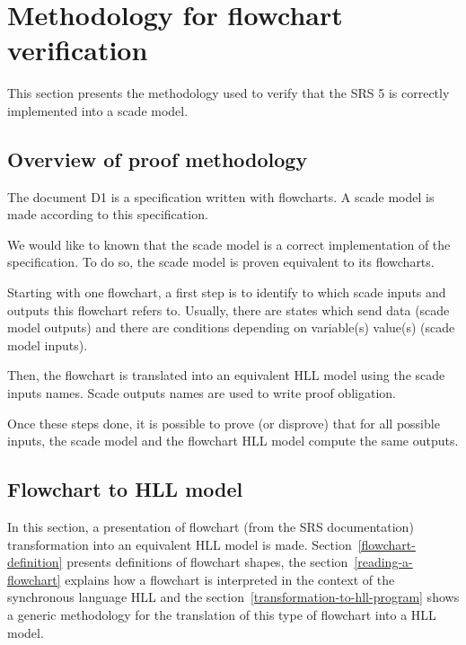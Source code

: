 \section{Methodology for flowchart verification}
\label{methodology}
This section presents the methodology used to verify that the SRS 5 is
correctly implemented into a scade model.

\subsection{Overview of proof methodology}
\label{overview}
The document D1 is a specification written with flowcharts. A scade
model is made according to this specification.

We would like to known that the scade model is a correct
implementation of the specification. To do so, the scade model is
proven equivalent to its flowcharts.

Starting with one flowchart, a first step is to identify to which
scade inputs and outputs this flowchart refers to. Usually, there are
states which send data (scade model outputs) and there are conditions
depending on variable(s) value(s) (scade model inputs).

Then, the flowchart is translated into an equivalent HLL model using
the scade inputs names. Scade outputs names are used to write proof
obligation.

Once these steps done, it is possible to prove (or disprove) that for
all possible inputs, the scade model and the flowchart HLL model
compute the same outputs.


\subsection{Flowchart to HLL model}
\label{flowchart-2-hll}
In this section, a presentation of flowchart (from the SRS
documentation) transformation into an equivalent HLL model is
made. Section~\ref{flowchart-definition} presents definitions of
flowchart shapes, the section~\ref{reading-a-flowchart} explains how a
flowchart is interpreted in the context of the synchronous language
HLL and the section~\ref{transformation-to-hll-program} shows a
generic methodology for the translation of this type of flowchart into
a HLL model.
